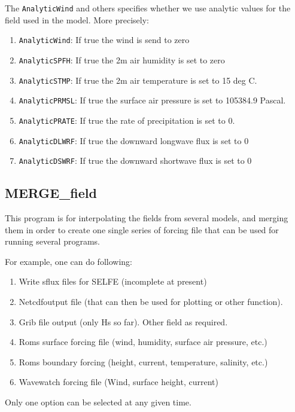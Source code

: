 \documentclass[12pt]{amsart}
\begin{document}
The {\tt AnalyticWind} and others specifies whether we use analytic values for the field used in the model.
More precisely:
\begin{enumerate}
\item {\tt AnalyticWind}: If true the wind is send to zero
\item {\tt AnalyticSPFH}: If true the 2m air humidity is set to zero
\item {\tt AnalyticSTMP}: If true the 2m air temperature is set to 15 deg C.
\item {\tt AnalyticPRMSL}: If true the surface air pressure is set to 105384.9 Pascal.
\item {\tt AnalyticPRATE}: If true the rate of precipitation is set to 0.
\item {\tt AnalyticDLWRF}: If true the downward longwave flux is set to 0
\item {\tt AnalyticDSWRF}: If true the downward shortwave flux is set to 0
\end{enumerate}



\subsection{MERGE\_field}

This program is for interpolating the fields from several models, and merging them in order to
create one single series of forcing file that can be used for running several programs.

For example, one can do following:
\begin{enumerate}
\item Write sflux files for SELFE (incomplete at present)
\item Netcdfoutput file (that can then be used for plotting or other function).
\item Grib file output (only Hs so far). Other field as required.
\item Roms surface forcing file (wind, humidity, surface air pressure, etc.)
\item Roms boundary forcing (height, current, temperature, salinity, etc.)
\item Wavewatch forcing file (Wind, surface height, current)
\end{enumerate}
Only one option can be selected at any given time.
\end{document}
